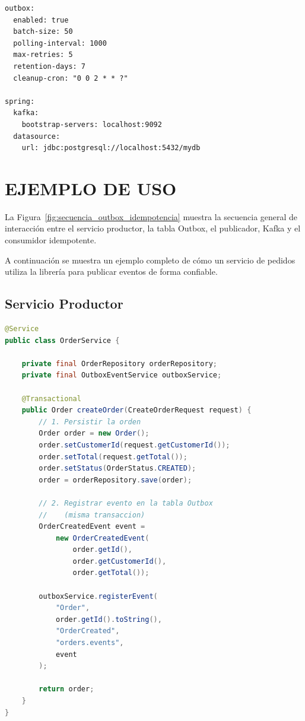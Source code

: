 \begin{lstlisting}[caption={Ejemplo de configuración en application.yml.}]
outbox:
  enabled: true
  batch-size: 50
  polling-interval: 1000
  max-retries: 5
  retention-days: 7
  cleanup-cron: "0 0 2 * * ?"

spring:
  kafka:
    bootstrap-servers: localhost:9092
  datasource:
    url: jdbc:postgresql://localhost:5432/mydb
\end{lstlisting}

\section{EJEMPLO DE USO}

La Figura~\ref{fig:secuencia_outbox_idempotencia} muestra la secuencia general de interacción entre el servicio productor, la tabla Outbox, el publicador, Kafka y el consumidor idempotente.



A continuación se muestra un ejemplo completo de cómo un servicio de pedidos utiliza la librería para publicar eventos de forma confiable.

\subsection{Servicio Productor}

\begin{lstlisting}[language=Java, caption={Ejemplo de uso de la librería en un servicio de pedidos.}]
@Service
public class OrderService {

    private final OrderRepository orderRepository;
    private final OutboxEventService outboxService;

    @Transactional
    public Order createOrder(CreateOrderRequest request) {
        // 1. Persistir la orden
        Order order = new Order();
        order.setCustomerId(request.getCustomerId());
        order.setTotal(request.getTotal());
        order.setStatus(OrderStatus.CREATED);
        order = orderRepository.save(order);

        // 2. Registrar evento en la tabla Outbox
        //    (misma transaccion)
        OrderCreatedEvent event =
            new OrderCreatedEvent(
                order.getId(),
                order.getCustomerId(),
                order.getTotal());

        outboxService.registerEvent(
            "Order",
            order.getId().toString(),
            "OrderCreated",
            "orders.events",
            event
        );

        return order;
    }
}
\end{lstlisting}

